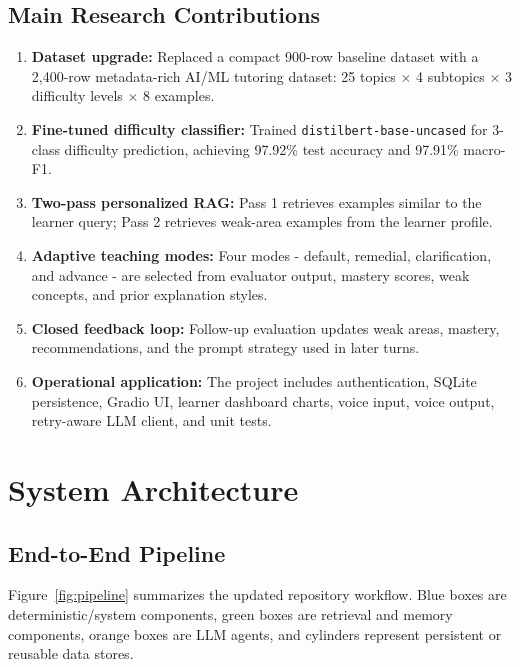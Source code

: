 \documentclass[11pt,a4paper]{article}
\begin{document}
\subsection{Main Research Contributions}

\begin{contribbox}
\begin{enumerate}
    \item \textbf{Dataset upgrade:} Replaced a compact 900-row baseline dataset with a 2,400-row metadata-rich AI/ML tutoring dataset: 25 topics $\times$ 4 subtopics $\times$ 3 difficulty levels $\times$ 8 examples.
    \item \textbf{Fine-tuned difficulty classifier:} Trained \texttt{distilbert-base-uncased} for 3-class difficulty prediction, achieving 97.92\% test accuracy and 97.91\% macro-F1.
    \item \textbf{Two-pass personalized RAG:} Pass 1 retrieves examples similar to the learner query; Pass 2 retrieves weak-area examples from the learner profile.
    \item \textbf{Adaptive teaching modes:} Four modes - default, remedial, clarification, and advance - are selected from evaluator output, mastery scores, weak concepts, and prior explanation styles.
    \item \textbf{Closed feedback loop:} Follow-up evaluation updates weak areas, mastery, recommendations, and the prompt strategy used in later turns.
    \item \textbf{Operational application:} The project includes authentication, SQLite persistence, Gradio UI, learner dashboard charts, voice input, voice output, retry-aware LLM client, and unit tests.
\end{enumerate}
\end{contribbox}

\section{System Architecture}

\subsection{End-to-End Pipeline}

Figure~\ref{fig:pipeline} summarizes the updated repository workflow. Blue boxes are deterministic/system components, green boxes are retrieval and memory components, orange boxes are LLM agents, and cylinders represent persistent or reusable data stores.
\end{document}
